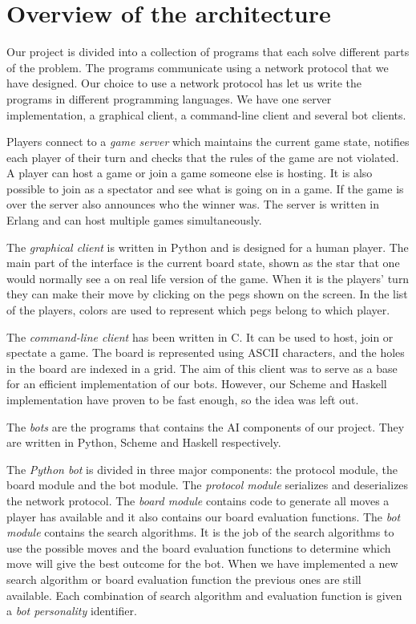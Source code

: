 \section{Overview of the architecture}

Our project is divided into a collection of programs that each solve
different parts of the problem. The programs communicate using a
network protocol that we have designed. Our choice to use a network
protocol has let us write the programs in different programming
languages. We have one server implementation, a graphical client, a
command-line client and several bot clients.

Players connect to a \emph{game server} which maintains the current
game state, notifies each player of their turn and checks that the
rules of the game are not violated. A player can host a game or join a
game someone else is hosting. It is also possible to join as a
spectator and see what is going on in a game. If the game is over the
server also announces who the winner was. The server is written in
Erlang and can host multiple games simultaneously.

The \emph{graphical client} is written in Python and is designed for a
human player. The main part of the interface is the current board
state, shown as the star that one would normally see a on real life
version of the game. When it is the players' turn they can make their
move by clicking on the pegs shown on the screen.
In the list of the players, colors are used to represent which pegs belong to
which player.

The \emph{command-line client} has been written in C. It can be used to
host, join or spectate a game. The board is represented using ASCII
characters, and the holes in the board are indexed in a grid. The aim
of this client was to serve as a base for an efficient implementation of
our bots. However, our Scheme and Haskell implementation have proven to
be fast enough, so the idea was left out.

The \emph{bots} are the programs that contains the AI components of our
project. They are written in Python, Scheme and Haskell respectively.

The \emph{Python bot} is divided in three major components: the protocol
module, the board module and the bot module. The \emph{protocol module}
serializes and deserializes the network protocol. The \emph{board module}
contains code to generate all moves a player has available and it also
contains our board evaluation functions. The \emph{bot module} contains
the search algorithms. It is the job of the search algorithms to use the
possible moves and the board evaluation functions to determine which move
will give the best outcome for the bot. When we have implemented a new
search algorithm or board evaluation function the previous ones are still
available. Each combination of search algorithm and evaluation function
is given a \emph{bot personality} identifier.

